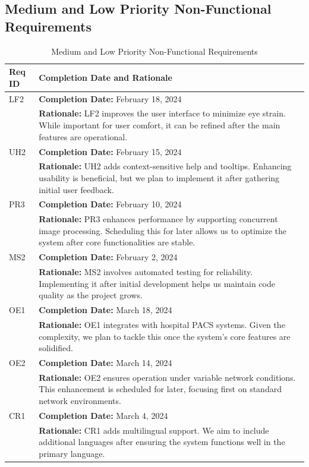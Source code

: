 \documentclass[12pt]{article}
\begin{document}
  \subsection{Medium and Low Priority Non-Functional Requirements}
\begin{table}[H]
  \label{TblMediumLowPriorityNFRs}
  \begin{tabular}{p{}|p{}}
  \toprule
  \textbf{Req ID} & \textbf{Completion Date and Rationale} \\
  \midrule
  LF2 & \textbf{Completion Date:} February 18, 2024\\
      & \textbf{Rationale:} LF2 improves the user interface to minimize eye strain. While important for user comfort, it can be refined after the main features are operational. \\
  \midrule
  UH2 & \textbf{Completion Date:} February 15, 2024\\
      & \textbf{Rationale:} UH2 adds context-sensitive help and tooltips. Enhancing usability is beneficial, but we plan to implement it after gathering initial user feedback. \\
  \midrule
  PR3 & \textbf{Completion Date:} February 10, 2024\\
      & \textbf{Rationale:} PR3 enhances performance by supporting concurrent image processing. Scheduling this for later allows us to optimize the system after core functionalities are stable. \\
  \midrule
  MS2 & \textbf{Completion Date:} February 2, 2024\\
      & \textbf{Rationale:} MS2 involves automated testing for reliability. Implementing it after initial development helps us maintain code quality as the project grows. \\
  \midrule
  OE1 & \textbf{Completion Date:} March 18, 2024\\
       & \textbf{Rationale:} OE1 integrates with hospital PACS systems. Given the complexity, we plan to tackle this once the system's core features are solidified. \\
  \midrule
  OE2 & \textbf{Completion Date:} March 14, 2024\\
       & \textbf{Rationale:} OE2 ensures operation under variable network conditions. This enhancement is scheduled for later, focusing first on standard network environments. \\
  \midrule
  CR1 & \textbf{Completion Date:} March 4, 2024\\
       & \textbf{Rationale:} CR1 adds multilingual support. We aim to include additional languages after ensuring the system functions well in the primary language. \\
  \bottomrule
  \end{tabular}
  \caption{Medium and Low Priority Non-Functional Requirements}
  \end{table}
  
\end{document}
